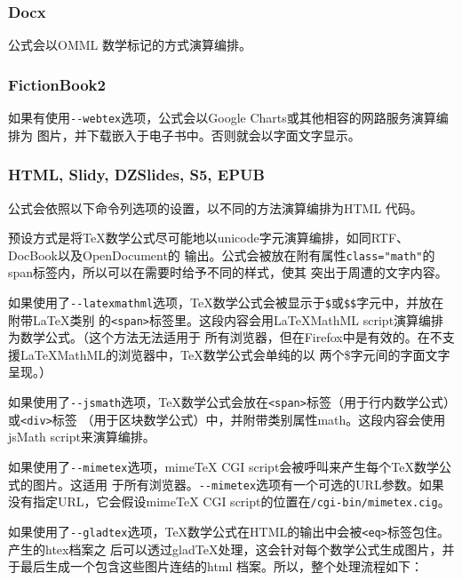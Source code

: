 \documentclass[fancyhdr,bookmark]{ctexbook}
\newcommand{\passthrough}[1]{#1}
\begin{document}
\hypertarget{docx}{%
\subsubsection{Docx}\label{docx}}

公式会以OMML 数学标记的方式演算编排。

\hypertarget{fictionbook2}{%
\subsubsection{FictionBook2}\label{fictionbook2}}

如果有使用\passthrough{\lstinline!--webtex!}选项，公式会以Google
Charts或其他相容的网路服务演算编排为
图片，并下载嵌入于电子书中。否则就会以字面文字显示。

\hypertarget{html-slidy-dzslides-s5-epub}{%
\subsubsection{HTML, Slidy, DZSlides, S5,
EPUB}\label{html-slidy-dzslides-s5-epub}}

公式会依照以下命令列选项的设置，以不同的方法演算编排为HTML 代码。

预设方式是将TeX数学公式尽可能地以unicode字元演算编排，如同RTF、DocBook以及OpenDocument的
输出。公式会被放在附有属性\passthrough{\lstinline!class="math"!}的span标签内，所以可以在需要时给予不同的样式，使其
突出于周遭的文字内容。

如果使用了\passthrough{\lstinline!--latexmathml!}选项，TeX数学公式会被显示于\passthrough{\lstinline!$!}或\passthrough{\lstinline!$$!}字元中，并放在附带LaTeX类别
的\passthrough{\lstinline!<span>!}标签里。这段内容会用LaTeXMathML
script演算编排为数学公式。（这个方法无法适用于
所有浏览器，但在Firefox中是有效的。在不支援LaTeXMathML的浏览器中，TeX数学公式会单纯的以
两个\$字元间的字面文字呈现。）

如果使用了\passthrough{\lstinline!--jsmath!}选项，TeX数学公式会放在\passthrough{\lstinline!<span>!}标签（用于行内数学公式）或\passthrough{\lstinline!<div>!}标签
（用于区块数学公式）中，并附带类别属性math。这段内容会使用jsMath
script来演算编排。

如果使用了\passthrough{\lstinline!--mimetex!}选项，mimeTeX CGI
script会被呼叫来产生每个TeX数学公式的图片。这适用
于所有浏览器。\passthrough{\lstinline!--mimetex!}选项有一个可选的URL参数。如果没有指定URL，它会假设mimeTeX
CGI script的位置在\passthrough{\lstinline!/cgi-bin/mimetex.cig!}。

如果使用了\passthrough{\lstinline!--gladtex!}选项，TeX数学公式在HTML的输出中会被\passthrough{\lstinline!<eq>!}标签包住。产生的htex档案之
后可以透过gladTeX处理，这会针对每个数学公式生成图片，并于最后生成一个包含这些图片连结的html
档案。所以，整个处理流程如下：
\end{document}

